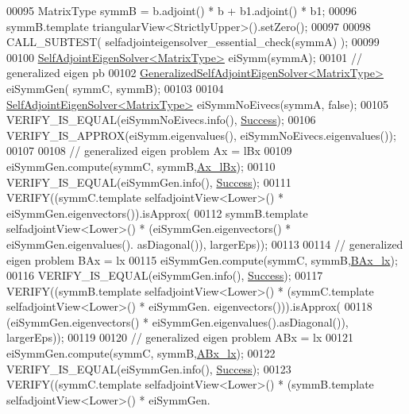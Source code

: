 \begin{DoxyCode}
00095   MatrixType symmB = b.adjoint() * b + b1.adjoint() * b1;
00096   symmB.template triangularView<StrictlyUpper>().setZero();
00097   
00098   CALL\_SUBTEST( selfadjointeigensolver\_essential\_check(symmA) );
00099 
00100   \hyperlink{group___eigenvalues___module_class_eigen_1_1_self_adjoint_eigen_solver}{SelfAdjointEigenSolver<MatrixType>} eiSymm(symmA);
00101   \textcolor{comment}{// generalized eigen pb}
00102   \hyperlink{group___eigenvalues___module_class_eigen_1_1_generalized_self_adjoint_eigen_solver}{GeneralizedSelfAdjointEigenSolver<MatrixType>} eiSymmGen(
      symmC, symmB);
00103 
00104   \hyperlink{group___eigenvalues___module_class_eigen_1_1_self_adjoint_eigen_solver}{SelfAdjointEigenSolver<MatrixType>} eiSymmNoEivecs(symmA, \textcolor{keyword}{false});
00105   VERIFY\_IS\_EQUAL(eiSymmNoEivecs.info(), \hyperlink{group__enums_gga85fad7b87587764e5cf6b513a9e0ee5ea52581b035f4b59c203b8ff999ef5fcea}{Success});
00106   VERIFY\_IS\_APPROX(eiSymm.eigenvalues(), eiSymmNoEivecs.eigenvalues());
00107   
00108   \textcolor{comment}{// generalized eigen problem Ax = lBx}
00109   eiSymmGen.compute(symmC, symmB,\hyperlink{group__enums_ggae3e239fb70022eb8747994cf5d68b4a9a1a7cefbb22c2c3928d246b753cf53633}{Ax\_lBx});
00110   VERIFY\_IS\_EQUAL(eiSymmGen.info(), \hyperlink{group__enums_gga85fad7b87587764e5cf6b513a9e0ee5ea52581b035f4b59c203b8ff999ef5fcea}{Success});
00111   VERIFY((symmC.template selfadjointView<Lower>() * eiSymmGen.eigenvectors()).isApprox(
00112           symmB.template selfadjointView<Lower>() * (eiSymmGen.eigenvectors() * eiSymmGen.eigenvalues().
      asDiagonal()), largerEps));
00113 
00114   \textcolor{comment}{// generalized eigen problem BAx = lx}
00115   eiSymmGen.compute(symmC, symmB,\hyperlink{group__enums_ggae3e239fb70022eb8747994cf5d68b4a9a5b64c528c90483f0b716018cad0143f8}{BAx\_lx});
00116   VERIFY\_IS\_EQUAL(eiSymmGen.info(), \hyperlink{group__enums_gga85fad7b87587764e5cf6b513a9e0ee5ea52581b035f4b59c203b8ff999ef5fcea}{Success});
00117   VERIFY((symmB.template selfadjointView<Lower>() * (symmC.template selfadjointView<Lower>() * eiSymmGen.
      eigenvectors())).isApprox(
00118          (eiSymmGen.eigenvectors() * eiSymmGen.eigenvalues().asDiagonal()), largerEps));
00119 
00120   \textcolor{comment}{// generalized eigen problem ABx = lx}
00121   eiSymmGen.compute(symmC, symmB,\hyperlink{group__enums_ggae3e239fb70022eb8747994cf5d68b4a9afc36646eaa4187858eaad466d32a2096}{ABx\_lx});
00122   VERIFY\_IS\_EQUAL(eiSymmGen.info(), \hyperlink{group__enums_gga85fad7b87587764e5cf6b513a9e0ee5ea52581b035f4b59c203b8ff999ef5fcea}{Success});
00123   VERIFY((symmC.template selfadjointView<Lower>() * (symmB.template selfadjointView<Lower>() * eiSymmGen.

\end{DoxyCode}
